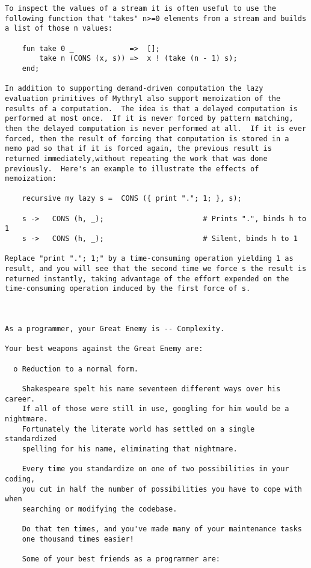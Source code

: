 \begin{verbatim}
To inspect the values of a stream it is often useful to use the 
following function that "takes" n>=0 elements from a stream and builds 
a list of those n values: 
 
    fun take 0 _             =>  []; 
        take n (CONS (x, s)) =>  x ! (take (n - 1) s); 
    end;  
 
In addition to supporting demand-driven computation the lazy 
evaluation primitives of Mythryl also support memoization of the 
results of a computation.  The idea is that a delayed computation is 
performed at most once.  If it is never forced by pattern matching, 
then the delayed computation is never performed at all.  If it is ever 
forced, then the result of forcing that computation is stored in a 
memo pad so that if it is forced again, the previous result is 
returned immediately,without repeating the work that was done 
previously.  Here's an example to illustrate the effects of 
memoization: 
 
    recursive my lazy s =  CONS ({ print "."; 1; }, s);  
 
    s ->   CONS (h, _);                       # Prints ".", binds h to 1  
    s ->   CONS (h, _);                       # Silent, binds h to 1  
 
Replace "print "."; 1;" by a time-consuming operation yielding 1 as 
result, and you will see that the second time we force s the result is 
returned instantly, taking advantage of the effort expended on the 
time-consuming operation induced by the first force of s. 
 


As a programmer, your Great Enemy is -- Complexity.

Your best weapons against the Great Enemy are:

  o Reduction to a normal form.

    Shakespeare spelt his name seventeen different ways over his career.
    If all of those were still in use, googling for him would be a nightmare.
    Fortunately the literate world has settled on a single standardized
    spelling for his name, eliminating that nightmare. 

    Every time you standardize on one of two possibilities in your coding,
    you cut in half the number of possibilities you have to cope with when
    searching or modifying the codebase.

    Do that ten times, and you've made many of your maintenance tasks
    one thousand times easier!

    Some of your best friends as a programmer are:


\end{verbatim}
